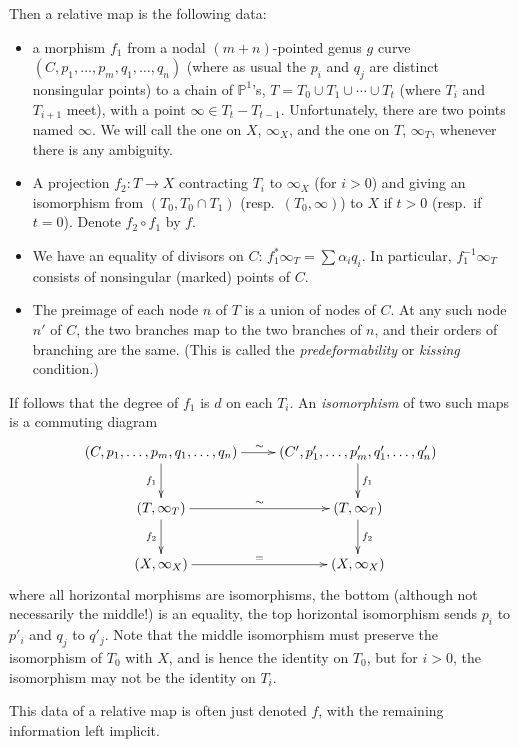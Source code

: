 \documentclass[12pt,letterpaper]{amsart}
\newcommand{\proj}{\mathbb P}
\newcommand{\al}{\alpha}
\begin{document}
{Then a relative map is the following data:
\begin{itemize}
\item
a morphism $f_1$ from a nodal 
$(m+n)$-pointed genus $g$ curve $(C, p_1, \dots, p_m, q_1, \dots, q_n)$ (where
as usual the $p_i$ and $q_j$ are distinct nonsingular points) to a
chain of $\proj^1$'s, $T = T_0 \cup T_1 \cup \cdots \cup T_t$ (where
$T_i$ and $T_{i+1}$ meet), with a point $\infty \in T_t - T_{t-1}$.
Unfortunately, there are two points named $\infty$.  We will call the one on $X$,  $\infty_X$, and the one on $T$, $\infty_T$, whenever there is any ambiguity.
\item  A projection $f_2: T \rightarrow X$ contracting $T_i$ 
to $\infty_X$ (for $i>0$)
and giving an isomorphism from $(T_0, T_0 \cap T_1)$ 
(resp.\ $(T_0, \infty)$) 
to $X$ if $t>0$  (resp.\ if $t=0$).  Denote $f_2 \circ f_1$ by $f$.
\item We have an equality of divisors on $C$: $f_1^* \infty_T = \sum \al_i q_i$.
In particular,  $f_1^{-1} \infty_T$ consists 
of nonsingular (marked) points of $C$.
\item The preimage of each node $n$ of $T$ is a union of nodes of $C$.
  At any such node $n'$ of $C$, the two branches map to the two
  branches of $n$, and their orders of branching are the same.  (This
  is called the {\em predeformability} or {\em kissing} condition.)
\end{itemize}
If follows that the degree of  $f_1$ is
$d$ on each $T_i$.
An {\em isomorphism} of two such maps is a commuting diagram
$$
\xymatrix{
(C, p_1, \dots, p_m, q_1, \dots, q_n) \ar[d]_{f_1} \ar[r]^{\sim} & 
(C', p'_1, \dots, p'_m, q'_1, \dots, q'_n) \ar[d]^{f_1} \\
(T, \infty_T) \ar[r]^{\sim} \ar[d]_{f_2} &  (T, \infty_T) \ar[d]^{f_2}\\
(X,\infty_X) \ar[r]^= & (X,\infty_X)}
$$
where all horizontal morphisms are isomorphisms, the bottom (although
not necessarily the middle!) is an equality, the top horizontal
isomorphism sends $p_i$ to $p'_i$ and $q_j$ to $q'_j$.  Note that the
middle isomorphism must  preserve the isomorphism of $T_0$ with $X$, and is
hence the identity on $T_0$, but for $i>0$, the isomorphism may not be
the identity on $T_i$.

This data of a relative map is often just denoted $f$, with the remaining information left
 implicit.

}
\end{document}
